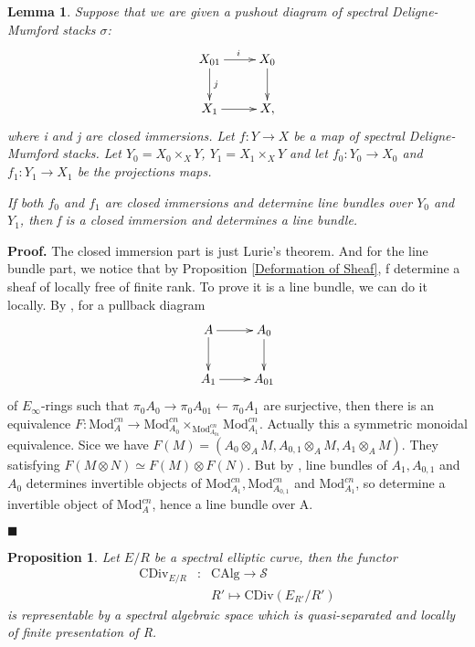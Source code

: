 \documentclass[12pt]{article}
\newtheorem{proposition}[theorem]{Proposition}
\newtheorem{lemma}[theorem]{Lemma}
\theoremstyle{thry}
\renewenvironment{proof}
{\par \noindent \textbf{Proof.}}
{ \par \hfill $\blacksquare$ \quad \par }
\def  \CAlg     {\mathrm{CAlg}}
\def  \CDiv     {\mathrm{CDiv}}
\def  \Mod      {\mathrm{Mod}}
\def  \cs       {\mathcal{S}}
\begin{document}
\begin{lemma} \label{Deformation Line Bundle}
	Suppose that we are given a pushout diagram of spectral Deligne-Mumford stacks $\sigma$:
	$$
	\xymatrix{
		X_{01} \ar[r]^{i}  \ar[d]^{j}  &  X_0 \ar[d] \\
		X_1 \ar[r]  &  X,   \\
	}
	$$
	where i and j are closed immersions. Let $f: Y\to X$ be a map of spectral Deligne-Mumford stacks. Let $Y_0= X_0 \times_X Y$, $Y_1 = X_1 \times_X Y$ and let $f_0:Y_0  \to X_0$ and $f_1: Y_1 \to X_1$ be the projections maps.
	
	If both $f_0$  and  $f_1$ are closed immersions  and determine  line bundles over $Y_0$ and $Y_1$, then f is a closed immersion and determines a line bundle.
\end{lemma}
\begin{proof}
	The closed immersion part is just Lurie's theorem. And for the line bundle part, we notice that by Proposition \ref{Deformation of Sheaf}, f determine a sheaf of locally free of finite rank. To prove it is a line bundle, we can do it locally. By \cite[Theorem 16.2.0.2]{lu-SAG},  for a pullback diagram
	$$
	\xymatrix{
	A \ar[r] \ar[d] &   A_0 \ar[d]   \\
	A_1    \ar[r]   &   A_{01}   \\
	}
	$$
	of $E_{\infty}$-rings such that $\pi_0 A_0 \to \pi_0 A_{01}  \leftarrow \pi_0 A_1$ are surjective, then there is an equivalence $ F: \Mod^{cn}_A \to \Mod^{cn}_{A_0} \times_{\Mod^{cn}_{A_{01}}}\Mod^{cn}_{A_1}$. Actually this a symmetric monoidal equivalence. Sice we have $F(M)= (A_0 \otimes_A M, A_{0,1} \otimes_A M, A_1 \otimes_A M)$. They satisfying $F(M \otimes N) \simeq  F(M) \otimes F(N)$. But by \cite[Propsition 2.9.4.2]{lu-SAG}, line bundles of $A_1, A_{0,1}$ and $A_0$ determines invertible objects of $\Mod^{cn}_{A_1}, \Mod^{cn}_{A_{0,1}}$ and $\Mod^{cn}_{A_1}$, so determine a invertible object of $\Mod^{cn}_A$,  hence a  line bundle over A. 
\end{proof}

\begin{proposition}
	Let $E/R$ be a spectral elliptic curve, then the functor
	\begin{eqnarray*}
		\CDiv_{E/R} & :& \CAlg \to \cs  \\
		&  &	R' \mapsto  \CDiv(E_{R'}/R')
	\end{eqnarray*}
	is representable by a spectral algebraic space which is quasi-separated and locally of finite presentation of R.
	
\end{proposition}
\end{document}
